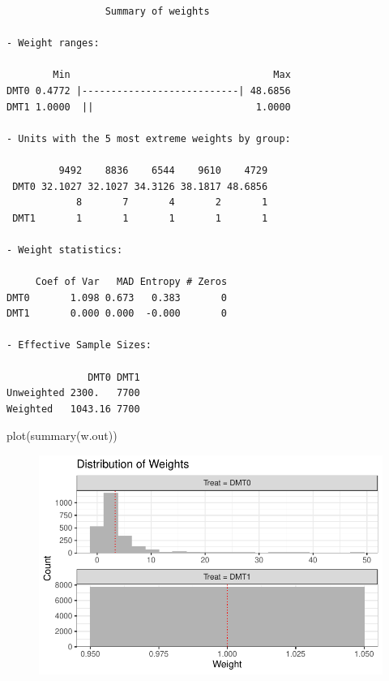 \documentclass[
  letterpaper,
  DIV=11,
  numbers=noendperiod]{scrreprt}
\newenvironment{Shaded}{\begin{snugshade}}{\end{snugshade}}
\newcommand{\FunctionTok}[1]{\textcolor[rgb]{0.28,0.35,0.67}{#1}}
\newcommand{\NormalTok}[1]{\textcolor[rgb]{0.00,0.23,0.31}{#1}}
\begin{document}
\begin{verbatim}
                 Summary of weights

- Weight ranges:

        Min                                   Max
DMT0 0.4772 |---------------------------| 48.6856
DMT1 1.0000  ||                            1.0000

- Units with the 5 most extreme weights by group:
                                             
         9492    8836    6544    9610    4729
 DMT0 32.1027 32.1027 34.3126 38.1817 48.6856
            8       7       4       2       1
 DMT1       1       1       1       1       1

- Weight statistics:

     Coef of Var   MAD Entropy # Zeros
DMT0       1.098 0.673   0.383       0
DMT1       0.000 0.000  -0.000       0

- Effective Sample Sizes:

              DMT0 DMT1
Unweighted 2300.   7700
Weighted   1043.16 7700
\end{verbatim}

\begin{Shaded}
\begin{Highlighting}[]
\FunctionTok{plot}\NormalTok{(}\FunctionTok{summary}\NormalTok{(w.out))}
\end{Highlighting}
\end{Shaded}

\begin{figure}[H]

{\centering \includegraphics{chapter_06_files/figure-pdf/unnamed-chunk-32-1.pdf}

}

\end{figure}
\end{document}
